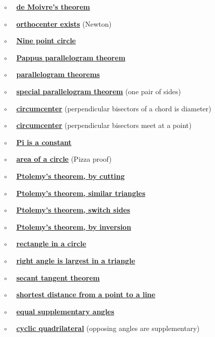 \documentclass[11pt, oneside]{article}
\begin{document}
$\circ$ \ \ \hyperref[sec:de_Moivre_theorem]{\textbf{de Moivre's theorem}}

$\circ$ \ \ \hyperref[sec:Newton_altitude]{\textbf{orthocenter exists}}  (Newton)

$\circ$ \ \ \hyperref[sec:nine_point_circle]{\textbf{Nine point circle}}

$\circ$ \ \ \hyperref[sec:PProof_Pappus]{\textbf{Pappus parallelogram theorem}}

$\circ$ \ \ \hyperref[sec:parallelogram_theorems]{\textbf{parallelogram theorems}}

$\circ$ \ \ \hyperref[sec:one_pair_of_sides]{\textbf{special parallelogram theorem}} (one pair of sides)

$\circ$ \ \ \hyperref[sec:perpendicular_bisector_of_a_chord]{\textbf{circumcenter}} (perpendicular bisectors of a chord is diameter)

$\circ$ \ \ \hyperref[sec:circumcenter]{\textbf{circumcenter}} (perpendicular bisectors meet at a point)

$\circ$ \ \ \hyperref[sec:Pi_is_a_constant]{\textbf{Pi is a constant}}

$\circ$ \ \ \hyperref[sec:pizza_proof]{\textbf{area of a circle}} (Pizza proof)

$\circ$ \ \ \hyperref[sec:Ptolemy]{\textbf{Ptolemy's theorem, by cutting}}

$\circ$ \ \ \hyperref[sec:Ptolemy_similar_triangles]{\textbf{Ptolemy's theorem, similar triangles}}

$\circ$ \ \ \hyperref[sec:Ptolemy_switch_sides]{\textbf{Ptolemy's theorem, switch sides}}

$\circ$ \ \ \hyperref[sec:Ptolemy_inversion]{\textbf{Ptolemy's theorem, by inversion}}

$\circ$ \ \ \hyperref[sec:rectangle_side_on_a_circle]{\textbf{rectangle in a circle}}

$\circ$ \ \ \hyperref[sec:right_angle_largest]{\textbf{right angle is largest in a triangle}}

$\circ$ \ \ \hyperref[sec:secant_tangent_theorem]{\textbf{secant tangent theorem}}

$\circ$ \ \ \hyperref[sec:shortest_distance_to_line]{\textbf{shortest distance from a point to a line}}

$\circ$ \ \ \hyperref[sec:equal_supplementary_angles]{\textbf{equal supplementary angles}}

$\circ$ \ \ \hyperref[sec:quadrilateral_supplementary]{\textbf{cyclic quadrilateral}} (opposing angles are supplementary)
\end{document}
